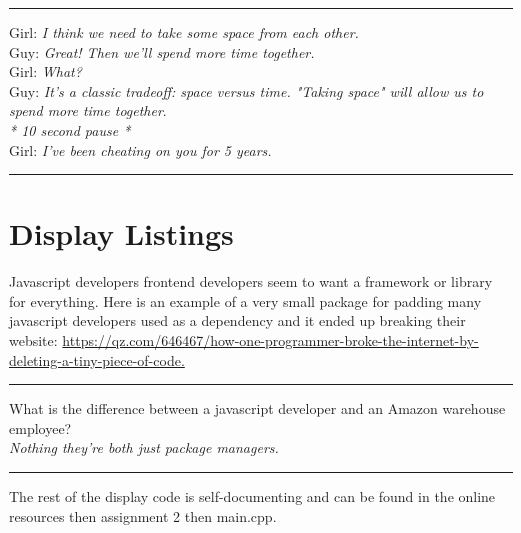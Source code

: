 \documentclass[letterpaper, 10pt]{article}
\begin{document}
\vspace{.25cm}
\hrule
\vspace{.25cm}
\noindent
Girl: \textit{I think we need to take some space from each other.}\\
Guy: \textit{Great! Then we'll spend more time together.}\\
Girl: \textit{What?}\\
Guy: \textit{It's a classic tradeoff: space versus time. "Taking space" will allow us to spend more time together}.\\
\textit{* 10 second pause *}\\
Girl: \textit{I've been cheating on you for 5 years.}\\
\hrule
\vspace{1cm}
\newpage
\section{Display Listings}
Javascript developers frontend developers seem to want a framework or library for everything.
Here is an example of a very small package for padding many javascript developers used as a 
dependency and it ended up breaking their website:
\url{https://qz.com/646467/how-one-programmer-broke-the-internet-by-deleting-a-tiny-piece-of-code.}

\vspace{.25cm}
\hrule
\vspace{.25cm}
\noindent
What is the difference between a javascript developer and an Amazon warehouse employee? \\ 
\textit{Nothing they're both just package managers.}\\
\hrule
\vspace{1cm}
\noindent
The rest of the display code is self-documenting and can be found in the online resources then assignment 2 then main.cpp.
\end{document}
